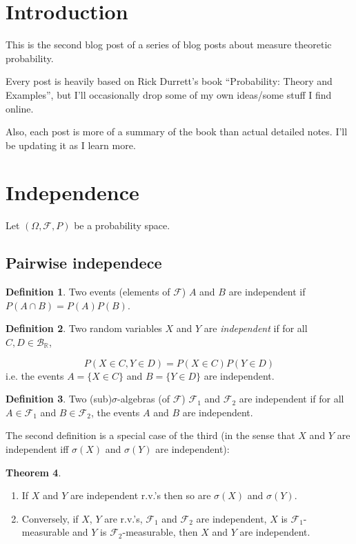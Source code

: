 \documentclass{article}
\theoremstyle{definition}
\newtheorem{theorem}{Theorem}[section]
\newtheorem{definition}[theorem]{Definition}
\begin{document}
\section{Introduction}

This is the second blog post of a series of blog posts about measure theoretic probability.

Every post is heavily based on Rick Durrett's book ``Probability: Theory and Examples'', but I'll occasionally
drop some of my own ideas/some stuff I find online.

Also, each post is more of a summary of the book than actual detailed notes. I'll be updating it as I learn more.

\section{Independence}


Let $(\Omega, \mathcal{F}, P)$ be a probability space.

\subsection{Pairwise independece}

\begin{definition}
    Two events (elements of $\mathcal{F}$) $A$ and $B$ are independent if $P(A \cap B) = P(A) P(B)$.
\end{definition}

\begin{definition}
    Two random variables $X$ and $Y$ are \emph{independent} if for all $C, D \in \mathcal{B}_{\mathbb{R}}$,

    $$ P(X \in C, Y \in D) = P(X \in C) P(Y \in D)$$
    i.e. the events $A = \{X \in C \}$ and $B = \{Y \in D\}$ are independent.
\end{definition}

\begin{definition}
    Two (sub)$\sigma$-algebras (of $\mathcal{F}$) $\mathcal{F}_1$ and $\mathcal{F}_2$ are independent if for all $A \in \mathcal{F}_1$ and $B \in \mathcal{F}_2$, the events $A$ and $B$ are independent.

\end{definition}

The second definition is a special case of the third (in the sense that $X$ and $Y$ are independent iff $\sigma(X)$ and $\sigma(Y)$ are independent):

\begin{theorem}
    \begin{enumerate}
        \item If $X$ and $Y$ are independent r.v.'s then so are $\sigma(X)$ and $\sigma(Y)$.
        \item Conversely, if $X$, $Y$ are r.v.'s, $\mathcal{F}_1$ and $\mathcal{F}_2$ are independent, $X$ is $\mathcal{F}_1$-measurable and $Y$ is $\mathcal{F}_2$-measurable, then $X$ and $Y$ are independent.
    \end{enumerate}
\end{theorem}
\end{document}

